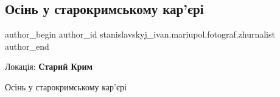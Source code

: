  
 
 
 
 

\subsection{Осінь у старокримському кар'єрі}
\label{sec:28_10_2021.fb.stanislavskyj_ivan.mariupol.fotograf.zhurnalist.1.osin_u_starokrymskomu_karjeri}

\ifcmt
 author_begin
   author_id stanislavskyj_ivan.mariupol.fotograf.zhurnalist
 author_end
\fi

Локація: \textbf{Старий Крим}

Осінь у старокримському кар'єрі
